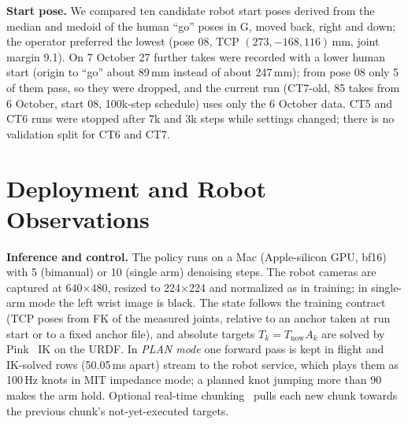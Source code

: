 \documentclass[conference,10pt]{IEEEtran}
\newcommand{\mm}{\,mm\xspace}
\begin{document}
\textbf{Start pose.} We compared ten candidate robot start poses derived from the median and medoid of the human ``go'' poses in G,
moved back, right and down; the operator preferred the lowest (pose 08, TCP $(273, -168, 116)$\mm, joint margin 9.1\textdegree). On
7 October 27 further takes were recorded with a lower human start (origin to ``go'' about 89\mm instead of about 247\mm); from pose 08
only 5 of them pass, so they were dropped, and the current run (CT7-old, 85 takes from 6 October, start 08, 100k-step schedule) uses
only the 6 October data. CT5 and CT6 runs were stopped after 7k and 3k steps while settings changed; there is no validation split
for CT6 and CT7.

\section{Deployment and Robot Observations}\label{sec:deploy}
\textbf{Inference and control.} The policy runs on a Mac (Apple-silicon GPU, bf16) with 5 (bimanual) or 10 (single arm) denoising
steps. The robot cameras are captured at 640$\times$480, resized to 224$\times$224 and normalized as in training; in single-arm mode
the left wrist image is black. The state follows the training contract (TCP poses from FK of the measured joints, relative to an
anchor taken at run start or to a fixed anchor file), and absolute targets $T_k=T_\text{now}A_k$ are solved by Pink~\cite{caron2024pink}
IK on the URDF. In \emph{PLAN mode} one forward pass is kept in flight and IK-solved rows (50.05\,ms apart) stream to the robot
service, which plays them as 100\,Hz knots in MIT impedance mode; a planned knot jumping more than 90\textdegree{} makes the arm hold.
Optional real-time chunking~\cite{black2025rtc} pulls each new chunk towards the previous chunk's not-yet-executed targets.
\end{document}

